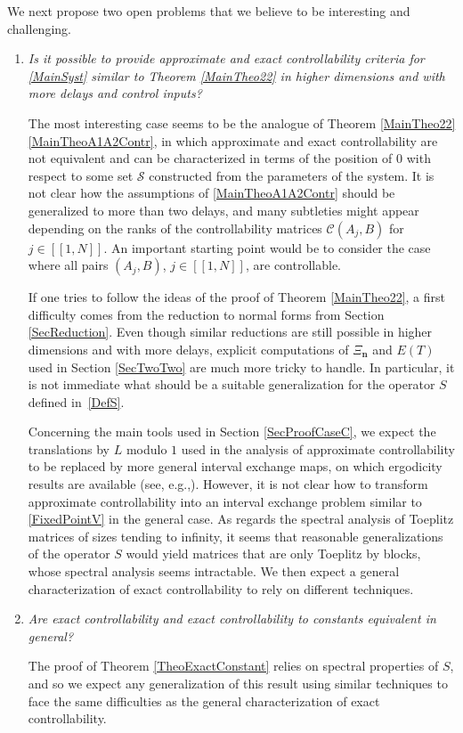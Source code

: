 \documentclass[10pt]{article}
\newcommand{\eg}{e.g.,\xspace}
\renewcommand{\eg}{e.g.,\xspace}
\newcommand{\bn}{\boldsymbol{n}}
\newcommand{\llbracket}{[\![}
\newcommand{\rrbracket}{]\!]}
\theoremstyle{plain}
\theoremstyle{definition}
\numberwithin{equation}{section}\numberwithin{figure}{section}\emergencystretch=3em
\begin{document}
We next propose two open problems that we believe to be interesting and challenging.\enlargethispage{-.1\baselineskip}%

\begin{enumerate}
\item \emph{Is it possible to provide approximate and exact controllability criteria for \eqref{MainSyst} similar to Theorem \ref{MainTheo22} in higher dimensions and with more delays and control inputs?}

The most interesting case seems to be the analogue of Theorem \ref{MainTheo22}\eqref{MainTheoA1A2Contr}, in which approximate and exact controllability are not equivalent and can be characterized in terms of the position of $0$ with respect to some set $\mathcal S$ constructed from the parameters of the system. It is not clear how the assumptions of \eqref{MainTheoA1A2Contr} should be generalized to more than two delays, and many subtleties might appear depending on the ranks of the controllability matrices $\mathcal C(A_j, B)$ for $j \in \llbracket 1, N\rrbracket$. An important starting point would be to consider the case where all pairs $(A_j, B)$, $j \in \llbracket 1, N\rrbracket$, are controllable.

If one tries to follow the ideas of the proof of Theorem \ref{MainTheo22}, a first difficulty comes from the reduction to normal forms from Section \ref{SecReduction}. Even though similar reductions are still possible in higher dimensions and with more delays, explicit computations of $\Xi_{\bn}$ and $E(T)$ used in Section \ref{SecTwoTwo} are much more tricky to handle. In particular, it is not immediate what should be a suitable generalization for the operator $S$ defined in~\eqref{DefS}.

Concerning the main tools used in Section \ref{SecProofCaseC}, we expect the translations by $L$ modulo $1$ used in the analysis of approximate controllability to be replaced by more general interval exchange maps, on which ergodicity results are available (see, \hbox{\eg \cite{Viana2006Ergodic}}). However, it is not clear how to transform approximate controllability into an interval exchange problem similar to \eqref{FixedPointV} in the general case. As regards the spectral analysis of Toeplitz matrices of sizes tending to infinity, it seems that reasonable generalizations of the operator $S$ would yield matrices that are only Toeplitz by blocks, whose spectral analysis seems intractable. We then expect a general characterization of exact controllability to rely on different techniques.

\item \emph{Are exact controllability and exact controllability to constants equivalent in general?}

The proof of Theorem \ref{TheoExactConstant} relies on spectral properties of $S$, and so we expect any generalization of this result using similar techniques to face the same difficulties as the general characterization of exact controllability.
\end{enumerate}
\end{document}
